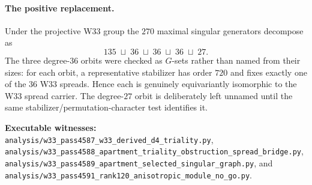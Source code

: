 \paragraph{The positive replacement.}
Under the projective W33 group the $270$ maximal singular generators decompose as
\[
  135\;\sqcup\;36\;\sqcup\;36\;\sqcup\;36\;\sqcup\;27.
\]
The three degree-$36$ orbits were checked as $G$-sets rather than named from their
sizes: for each orbit, a representative stabilizer has order $720$ and fixes
exactly one of the $36$ W33 spreads.  Hence each is genuinely equivariantly
isomorphic to the W33 spread carrier.  The degree-$27$ orbit is deliberately left
unnamed until the same stabilizer/permutation-character test identifies it.

\begin{center}
\end{center}

\noindent\textbf{Executable witnesses:}
\texttt{analysis/w33\_pass4587\_w33\_derived\_d4\_triality.py},
\texttt{analysis/w33\_pass4588\_apartment\_triality\_obstruction\_spread\_bridge.py},
\texttt{analysis/w33\_pass4589\_apartment\_selected\_singular\_graph.py}, and
\texttt{analysis/w33\_pass4591\_rank120\_anisotropic\_module\_no\_go.py}.